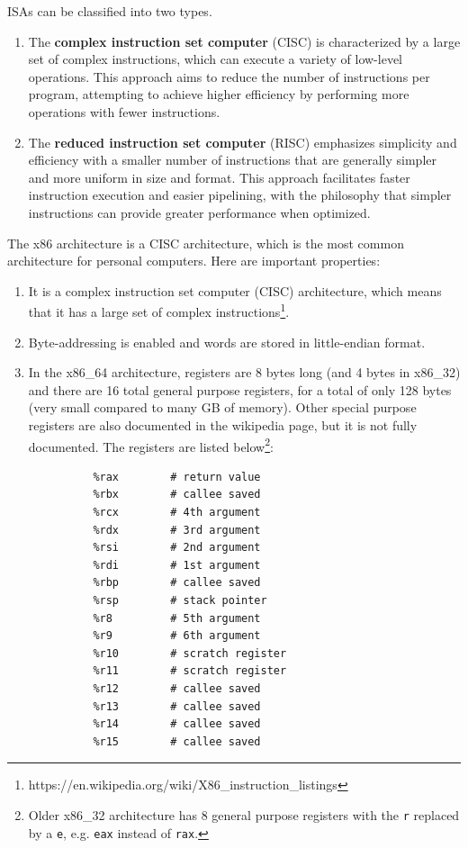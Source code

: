 \documentclass{article}
\begin{document}
    
    \begin{definition}
      ISAs can be classified into two types. 
      \begin{enumerate} 
        \item The \textbf{complex instruction set computer} (CISC) is characterized by a large set of complex instructions, which can execute a variety of low-level operations. This approach aims to reduce the number of instructions per program, attempting to achieve higher efficiency by performing more operations with fewer instructions.
        \item The \textbf{reduced instruction set computer} (RISC) emphasizes simplicity and efficiency with a smaller number of instructions that are generally simpler and more uniform in size and format. This approach facilitates faster instruction execution and easier pipelining, with the philosophy that simpler instructions can provide greater performance when optimized.
      \end{enumerate}
    \end{definition}

    \begin{example}[x86 Architecture]
      The x86 architecture is a CISC architecture, which is the most common architecture for personal computers. Here are important properties: 
      \begin{enumerate} 
        \item It is a complex instruction set computer (CISC) architecture, which means that it has a large set of complex instructions\footnote{https://en.wikipedia.org/wiki/X86\_instruction\_listings}. 
        \item Byte-addressing is enabled and words are stored in little-endian format.
        \item In the x86\_64 architecture, registers are 8 bytes long (and 4 bytes in x86\_32) and there are 16 total general purpose registers, for a total of only 128 bytes (very small compared to many GB of memory). Other special purpose registers are also documented in the wikipedia page, but it is not fully documented. The registers are listed below\footnote{Older x86\_32 architecture has 8 general purpose registers with the \texttt{r} replaced by a \texttt{e}, e.g. \texttt{eax} instead of \texttt{rax}.}: 
        \begin{lstlisting} 
          %rax        # return value 
          %rbx        # callee saved 
          %rcx        # 4th argument 
          %rdx        # 3rd argument 
          %rsi        # 2nd argument
          %rdi        # 1st argument 
          %rbp        # callee saved  
          %rsp        # stack pointer 
          %r8         # 5th argument 
          %r9         # 6th argument 
          %r10        # scratch register  
          %r11        # scratch register 
          %r12        # callee saved  
          %r13        # callee saved 
          %r14        # callee saved
          %r15        # callee saved
        \end{lstlisting}
        

      \end{enumerate}

    \end{example}
\end{document}
